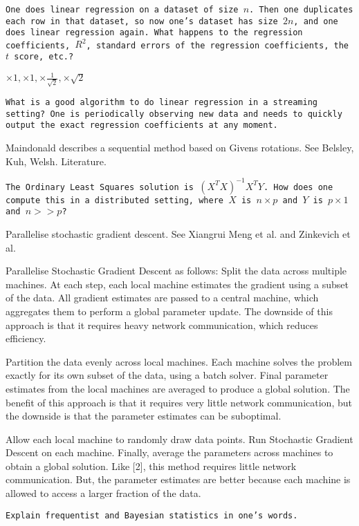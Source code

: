 \texttt{One does linear regression on a dataset of size $n$. Then one duplicates each row in that dataset, so now one's dataset has size $2n$, and one does linear regression again. What happens to the regression coefficients, $R^2$, standard errors of the regression coefficients, the $t$ score, etc.?}

$\boxed{\times 1,\times 1,\times \frac{1}{\sqrt{2}},\times \sqrt{2}}$

\texttt{What is a good algorithm to do linear regression in a streaming setting? One is periodically observing new data and needs to quickly output the exact regression coefficients at any moment.}

Maindonald describes a sequential method based on Givens rotations. See Belsley, Kuh, Welsh. Literature.

\texttt{The Ordinary Least Squares solution is $(X^T X)^{-1} X^T Y$. How does one compute this in a distributed setting, where $X$ is $n \times p$ and $Y$ is $p \times 1$ and $n >> p$?}

Parallelise stochastic gradient descent. See Xiangrui Meng et al. and Zinkevich et al.

Parallelise Stochastic Gradient Descent as follows: Split the data across multiple machines. At each step, each local machine estimates the gradient using a subset of the data. All gradient estimates are passed to a central machine, which aggregates them to perform a global parameter update. The downside of this approach is that it requires heavy network communication, which reduces efficiency.

Partition the data evenly across local machines. Each machine solves the problem exactly for its own subset of the data, using a batch solver. Final parameter estimates from the local machines are averaged to produce a global solution. The benefit of this approach is that it requires very little network communication, but the downside is that the parameter estimates can be suboptimal.

Allow each local machine to randomly draw data points. Run Stochastic Gradient Descent on each machine. Finally, average the parameters across machines to obtain a global solution. Like [2], this method requires little network communication. But, the parameter estimates are better because each machine is allowed to access a larger fraction of the data.

\texttt{Explain frequentist and Bayesian statistics in one's words.}


